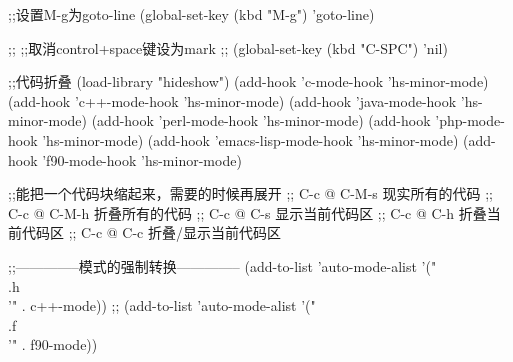 \begin{emacscode}
;;设置M-g为goto-line
(global-set-key (kbd "M-g") 'goto-line)

;; ;;取消control+space键设为mark
;; (global-set-key (kbd "C-SPC") 'nil)

;;代码折叠
(load-library "hideshow")
(add-hook 'c-mode-hook 'hs-minor-mode)
(add-hook 'c++-mode-hook 'hs-minor-mode)
(add-hook 'java-mode-hook 'hs-minor-mode)
(add-hook 'perl-mode-hook 'hs-minor-mode)
(add-hook 'php-mode-hook 'hs-minor-mode)
(add-hook 'emacs-lisp-mode-hook 'hs-minor-mode)
(add-hook 'f90-mode-hook 'hs-minor-mode)

;;能把一个代码块缩起来，需要的时候再展开
;; C-c @ C-M-s 现实所有的代码
;; C-c @ C-M-h 折叠所有的代码
;; C-c @ C-s   显示当前代码区
;; C-c @ C-h   折叠当前代码区
;; C-c @ C-c   折叠/显示当前代码区


;;--------------模式的强制转换--------------
(add-to-list 'auto-mode-alist '("\\.h\\'" . c++-mode))
;; (add-to-list 'auto-mode-alist '("\\.f\\'" . f90-mode))
\end{emacscode}





